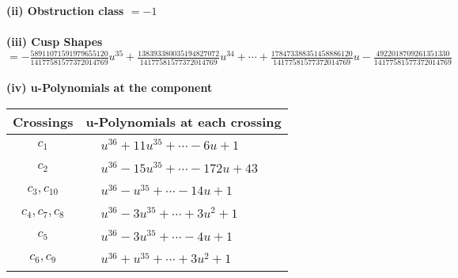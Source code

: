 \documentclass[1p]{elsarticle_modified}
\theoremstyle{definition}
\begin{document}
\flushleft \textbf{(ii) Obstruction class $= -1$}\\~\\
\flushleft \textbf{(iii) Cusp Shapes $= -\frac{58911071591979655120}{14177581577372014769} u^{35}+\frac{138393380035194827072}{14177581577372014769} u^{34}+\cdots+\frac{178473388351458886120}{14177581577372014769} u-\frac{4922018709261351330}{14177581577372014769}$}\\~\\
\newpage\renewcommand{\arraystretch}{1}
\flushleft \textbf{(iv) u-Polynomials at the component}\newline \\
\begin{tabular}{m{50pt}|m{274pt}}
Crossings & \hspace{64pt}u-Polynomials at each crossing \\
\hline $$\begin{aligned}c_{1}\end{aligned}$$&$\begin{aligned}
&u^{36}+11 u^{35}+\cdots-6 u+1
\end{aligned}$\\
\hline $$\begin{aligned}c_{2}\end{aligned}$$&$\begin{aligned}
&u^{36}-15 u^{35}+\cdots-172 u+43
\end{aligned}$\\
\hline $$\begin{aligned}c_{3},c_{10}\end{aligned}$$&$\begin{aligned}
&u^{36}- u^{35}+\cdots-14 u+1
\end{aligned}$\\
\hline $$\begin{aligned}c_{4},c_{7},c_{8}\end{aligned}$$&$\begin{aligned}
&u^{36}-3 u^{35}+\cdots+3 u^2+1
\end{aligned}$\\
\hline $$\begin{aligned}c_{5}\end{aligned}$$&$\begin{aligned}
&u^{36}-3 u^{35}+\cdots-4 u+1
\end{aligned}$\\
\hline $$\begin{aligned}c_{6},c_{9}\end{aligned}$$&$\begin{aligned}
&u^{36}+u^{35}+\cdots+3 u^2+1
\end{aligned}$\\
\hline
\end{tabular}\\~\\
\end{document}
